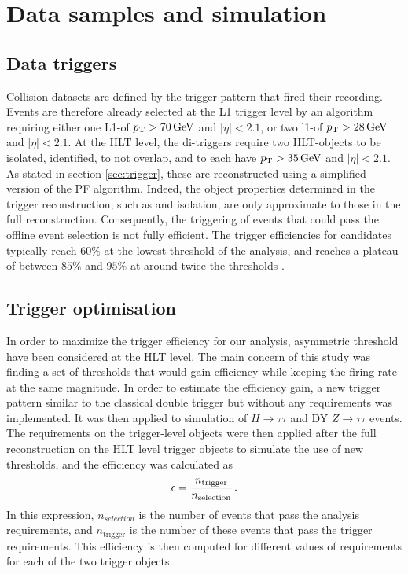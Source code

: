 \section{Data samples and simulation}
\label{sec:analysis_samples}

\subsection{Data triggers}
Collision datasets are defined by the trigger pattern that fired their recording. Events are therefore already selected at the L1 trigger level by an algorithm requiring either one L1-\tauh of $p_{\mathrm{T}} > 70\,\mathrm{GeV}$ and $|\eta| < 2.1$, or two l1-\tauh of $p_{\mathrm{T}} > 28\,\mathrm{GeV}$ and $|\eta| < 2.1$. At the HLT level, the di-\tauh triggers require two HLT-\tauh objects to be isolated, identified, to not overlap, and to each have $p_{\mathrm{T}} > 35\,\mathrm{GeV}$ and $|\eta| < 2.1$. As stated in section \ref{sec:trigger}, these \tauh are reconstructed using a simplified version of the PF algorithm. Indeed, the object properties determined in the trigger reconstruction, such as \pt and isolation, are only approximate to those in the full reconstruction. Consequently, the triggering of events that could pass the offline event selection is not fully efficient. The trigger efficiencies for \tauh candidates typically reach $60\%$ at the lowest \pt threshold of the analysis, and reaches a plateau of between $85\%$ and $95\%$ at around twice the \pt thresholds \cite{Sirunyan_2018}. 

\subsection{Trigger optimisation}

In order to maximize the trigger efficiency for our analysis, asymmetric \pt threshold have been considered at the HLT level. The main concern of this study was finding a set of \pt thresholds that would gain efficiency while keeping the firing rate at the same magnitude. 
In order to estimate the efficiency gain, a new trigger pattern similar to the classical double \tauh trigger but without any \pt requirements was implemented. It was then applied to simulation of $H\rightarrow \tau\tau$ and DY $Z\rightarrow\tau\tau$ events. The \pt requirements on the trigger-level objects were then applied after the full reconstruction on the HLT level \tauh trigger objects to simulate the use of new \pt thresholds, and the efficiency was calculated as
\begin{equation}
    \epsilon = \frac{n_{\mathrm{trigger}}}{n_{\mathrm{selection}}} \mend
\end{equation}
In this expression, $n_{selection}$ is the number of events that pass the analysis requirements, and $n_{\mathrm{trigger}}$ is the number of these events that pass the trigger \pt requirements. This efficiency is then computed for different values of \pt requirements for each of the two \tauh trigger objects.

